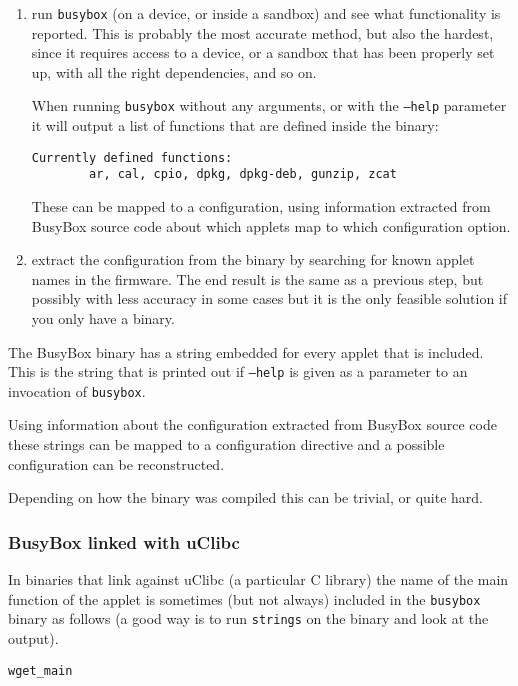 \documentclass[10pt]{article}
\begin{document}
\begin{enumerate}
\item run \texttt{busybox} (on a device, or inside a sandbox) and see what
functionality is reported. This is probably the most accurate method, but also
the hardest, since it requires access to a device, or a sandbox that has been
properly set up, with all the right dependencies, and so on.

When running \texttt{busybox} without any arguments, or with the \texttt{--help}
parameter it will output a list of functions that are defined inside the
binary:

\begin{verbatim}
Currently defined functions:
        ar, cal, cpio, dpkg, dpkg-deb, gunzip, zcat
\end{verbatim}

These can be mapped to a configuration, using information extracted from
BusyBox source code about which applets map to which configuration option.
\item extract the configuration from the binary by searching for known applet
names in the firmware. The end result is the same as a previous step, but
possibly with less accuracy in some cases but it is the only feasible solution
if you only have a binary.
\end{enumerate}

The BusyBox binary has a string embedded for every applet that is included.
This is the string that is printed out if \texttt{--help} is given as a
parameter to an invocation of \texttt{busybox}.

Using information about the configuration extracted from BusyBox source code
these strings can be mapped to a configuration directive and a possible
configuration can be reconstructed.

Depending on how the binary was compiled this can be trivial, or quite hard.

\subsubsection{BusyBox linked with uClibc}

In binaries that link against uClibc (a particular C library) the name of the
main function of the applet is sometimes (but not always) included in the
\texttt{busybox} binary as follows (a good way is to run \texttt{strings} on
the binary and look at the output).

\begin{verbatim}
wget_main
\end{verbatim}
\end{document}
